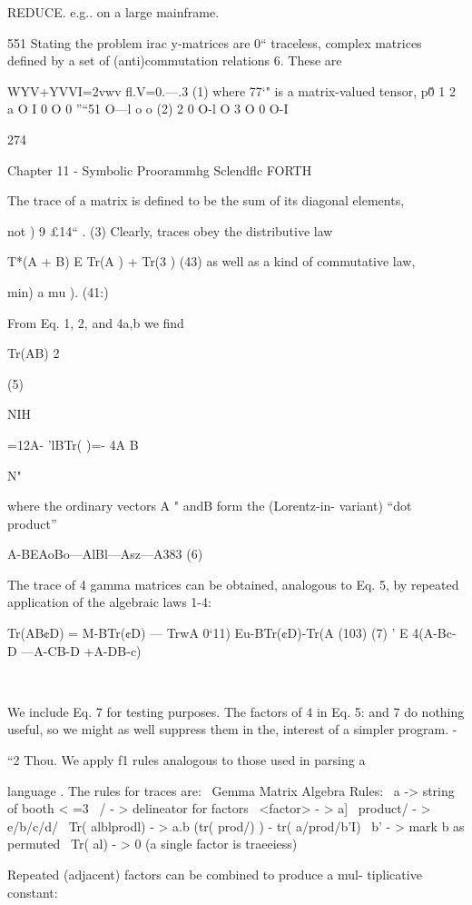 REDUCE. e.g.. on a large mainframe.

551 Stating the problem
irac y-matrices are 0“ traceless, complex matrices deﬁned
by a set of (anti)commutation relations 6. These are

WYV+YVVI=2vwv ﬂ.V=0.---.3 (1)
where 77‘" is a matrix-valued tensor,
p\v0 1 2 a
O I 0 O 0
”“51 O—l o o (2)
2 0 O-l O
3 O 0 O-I

274

Chapter 11 - Symbolic Proorammhg Sclendﬂc FORTH

The trace of a matrix is deﬁned to be the sum of its diagonal
elements,

not ) 9 £14“ . (3)
Clearly, traces obey the distributive law

T*(A + B) E Tr(A ) + Tr(3 ) (43)
as well as a kind of commutative law,

min) a mu ). (41:)

From Eq. 1, 2, and 4a,b we ﬁnd

Tr(AB) 2%

(5)

NIH

 

=12A- 'lBTr( )=- 4A B

N"

where the ordinary vectors A " andB form the (Lorentz-in-
variant) “dot product”

A-BEAoBo—AlBl—Asz—A383 (6)

The trace of 4 gamma matrices can be obtained, analogous to
Eq. 5, by repeated application of the algebraic laws 1-4:

Tr(AB¢D) = M-BTr(¢D) — TrwA 0‘11)
Eu-BTr(¢D)-Tr(A (103) (7) '
E 4(A-Bc-D —A-CB-D +A-DB-c)

\

We include Eq. 7 for testing purposes. The factors of 4 in Eq. 5:
and 7 do nothing useful, so we might as well suppress them in the,
interest of a simpler program. -


“2 Thou.
We apply f1 rules analogous to those used in parsing a

language . The rules for traces are:
\ Gemma Matrix Algebra Rules:
\ a -> string of booth < =3
\ / - > delineator for factors
\ <factor> - > a]
\ product/ - > e/b/c/d/
\ Tr( alblprodl) - > a.b (tr( prod/) ) - tr( a/prod/b'I)
\ b' - > mark b as permuted
\ Tr( al) - > 0 (a single factor is traeeiess)

Repeated (adjacent) factors can be combined to produce a mul-
tiplicative constant:

